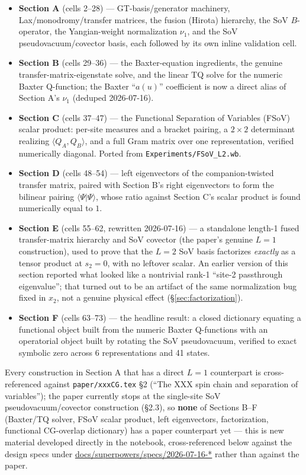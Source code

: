 \documentclass[11pt]{article}
\begin{document}
\begin{itemize}
\item \textbf{Section A} (cells 2--28) --- GT-basis/generator machinery, Lax/monodromy/transfer
  matrices, the fusion (Hirota) hierarchy, the SoV $B$-operator, the Yangian-weight normalization
  $\nu_1$, and the SoV pseudovacuum/covector basis, each followed by its own inline validation cell.
\item \textbf{Section B} (cells 29--36) --- the Baxter-equation ingredients, the genuine
  transfer-matrix-eigenstate solve, and the linear TQ solve for the numeric Baxter Q-function; the
  Baxter ``$a(u)$'' coefficient is now a direct alias of Section A's $\nu_1$ (deduped 2026-07-16).
\item \textbf{Section C} (cells 37--47) --- the Functional Separation of Variables (FSoV) scalar
  product: per-site measures and a bracket pairing, a $2\times2$ determinant realizing
  $\langle Q_A,Q_B\rangle$, and a full Gram matrix over one representation, verified numerically
  diagonal. Ported from \texttt{Experiments/FSoV\_L2.wb}.
\item \textbf{Section D} (cells 48--54) --- left eigenvectors of the companion-twisted transfer
  matrix, paired with Section B's right eigenvectors to form the bilinear pairing
  $\langle\Psi|\Psi\rangle$, whose ratio against Section C's scalar product is found numerically
  equal to $1$.
\item \textbf{Section E} (cells 55--62, rewritten 2026-07-16) --- a standalone length-1 fused
  transfer-matrix hierarchy and SoV covector (the paper's genuine $L=1$ construction), used to prove
  that the $L=2$ SoV basis factorizes \emph{exactly} as a tensor product at $s_2=0$, with no
  leftover scalar. An earlier version of this section reported what looked like a nontrivial rank-1
  ``site-2 passthrough eigenvalue''; that turned out to be an artifact of the same normalization
  bug fixed in $x_2$, not a genuine physical effect (\S\ref{sec:factorization}).
\item \textbf{Section F} (cells 63--73) --- the headline result: a closed dictionary equating a
  functional object built from the numeric Baxter Q-functions with an operatorial object built by
  rotating the SoV pseudovacuum, verified to exact symbolic zero across 6 representations and 41
  states.
\end{itemize}

Every construction in Section A that has a direct $L=1$ counterpart is cross-referenced against
\texttt{paper/xxxCG.tex} \S2 (``The XXX spin chain and separation of variables''); the paper
currently stops at the single-site SoV pseudovacuum/covector construction (\S2.3), so
\textbf{none} of Sections B--F (Baxter/TQ solver, FSoV scalar product, left eigenvectors,
factorization, functional CG-overlap dictionary) has a paper counterpart yet --- this is new
material developed directly in the notebook, cross-referenced below against the design specs under
\url{docs/superpowers/specs/2026-07-16-*} rather than against the paper.
\end{document}
